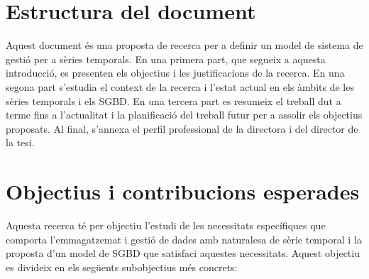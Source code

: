 \section{Estructura del document}

Aquest document és una proposta de recerca per a definir un model de
sistema de gestió per a sèries temporals. En una primera part, que
segueix a aquesta introducció, es presenten els objectius i les
justificacions de la recerca. En una segona part s'estudia el context
de la recerca i l'estat actual en els àmbits de les sèries temporals i
els SGBD. En una tercera part es resumeix el treball dut a terme fins
a l'actualitat i la planificació del treball futur per a assolir els
objectius proposats. Al final, s'annexa el perfil professional de la
directora i del director de la tesi.




\section{Objectius i contribucions esperades}
\label{sec:objectius}

Aquesta recerca té per objectiu l'estudi de les necessitats
específiques que comporta l'emmagatzemat i gestió de dades amb
naturalesa de sèrie temporal i la proposta d'un model de SGBD que
satisfaci aquestes necessitats. Aquest objectiu es divideix en els
següents subobjectius més concrets:

